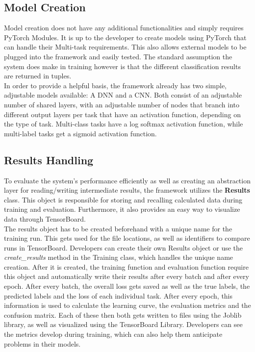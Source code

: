 \subsection{Model Creation} \label{Impl:Training:Model}

Model creation does not have any additional functionalities and simply requires PyTorch Modules. It is up to the developer to create models using PyTorch that can handle their Multi-task requirements. This also allows external models to be plugged into the framework and easily tested. The standard assumption the system does make in training however is that the different classification results are returned in tuples. \\

In order to provide a helpful basis, the framework already has two simple, adjustable models available: A DNN and a CNN. Both consist of an adjustable number of shared layers, with an adjustable number of nodes that branch into different output layers per task that have an activation function, depending on the type of task. Multi-class tasks have a log softmax activation function, while multi-label tasks get a sigmoid activation function. \\ 

\subsection{Results Handling} \label{Impl:Training:Results}

To evaluate the system's performance efficiently as well as creating an abstraction layer for reading/writing intermediate results, the framework utilizes the \textbf{Results} class. This object is responsible for storing and recalling calculated data during training and evaluation. Furthermore, it also provides an easy way to visualize data through TensorBoard. \\

The results object has to be created beforehand with a unique name for the training run. This gets used for the file locations, as well as identifiers to compare runs in TensorBoard. Developers can create their own Results object or use the \textit{create\_results} method in the Training class, which handles the unique name creation. After it is created, the training function and evaluation function require this object and automatically write their results after every batch and after every epoch. After every batch, the overall loss gets saved as well as the true labels, the predicted labels and the loss of each individual task. After every epoch, this information is used to calculate the learning curve, the evaluation metrics and the confusion matrix. Each of these then both gets written to files using the Joblib library, as well as visualized using the TensorBoard Library. Developers can see the metrics develop during training, which can also help them anticipate problems in their models. \\

